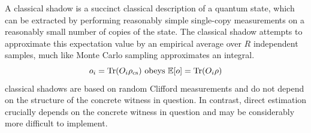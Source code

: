 \documentclass[
aps,
pra,
twocolumn,
floatfix,
]{revtex4-2}
\theoremstyle{plain}
\theoremstyle{definition}
\newtheorem{definition}{Definition}
\newcommand{\dm}{\rho}
\newcommand{\cs}{\text{cs}}
\begin{document}
A classical shadow is a succinct classical description of a quantum state, which can be extracted by performing reasonably simple single-copy measurements on a reasonably small number of copies of the state.
The classical shadow attempts to approximate this expectation value by an empirical average over $R$ independent samples, much like Monte Carlo sampling approximates an integral.
	\begin{equation}
		o_i = \Tr(O_i \dm_{\cs})
		\text{ obeys }
		\expectation[o] =\Tr(O_i \dm)
	\end{equation}
classical shadows are based on random Clifford measurements and do not depend on the structure of the concrete witness in question. In contrast, direct estimation crucially depends on the concrete witness in question and may be considerably more difficult to implement.


\end{document}
